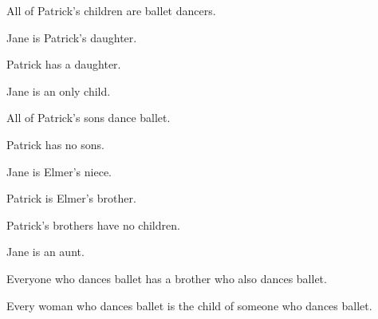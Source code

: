 \begin{compactlist}
\item All of Patrick's children are ballet dancers.
\item[] 
\item Jane is Patrick's daughter.
\item[] 
\item Patrick has a daughter.
\item[] 
\item Jane is an only child.
\item[] 
\item All of Patrick's sons dance ballet.
\item[] 
\item Patrick has no sons.
\item[] 
\item Jane is Elmer's niece.
\item[] 
\item Patrick is Elmer's brother.
\item[] 
\item Patrick's brothers have no children.
\item[] 
\item Jane is an aunt.
\item[] 
\item Everyone who dances ballet has a brother who also dances ballet.
\item[] 
\item Every woman who dances ballet is the child of someone who dances ballet.
\item[] 
\end{compactlist}


